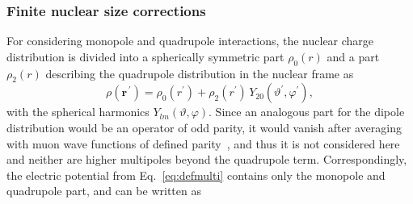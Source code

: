 \subsubsection{Finite nuclear size corrections}
\label{sec:radialEq}
For considering monopole and quadrupole interactions, the nuclear charge distribution is divided into a spherically symmetric part $\rho_0(r)$ and a part $\rho_2(r)$ describing the quadrupole distribution in the nuclear frame as~\cite{hitlin1970}
\begin{equation}
\label{eq:rho}
\rho(\mathbf{r}^{\,\prime}) = \rho_0(r^{\prime}) + \rho_2(r^{\prime}) \, Y_{20}(\vartheta^\prime,\varphi^\prime),
\end{equation}
with the spherical harmonics $Y_{lm}(\vartheta,\varphi)$. Since an analogous part for the dipole distribution would be an operator of odd parity, it would vanish after averaging with muon wave functions of defined parity~\cite{johnson2007}, and thus it is not considered here and neither are higher multipoles beyond the quadrupole term. Correspondingly, the electric potential from Eq.~\eqref{eq:defmulti} contains only the monopole and quadrupole part, and can be written as
